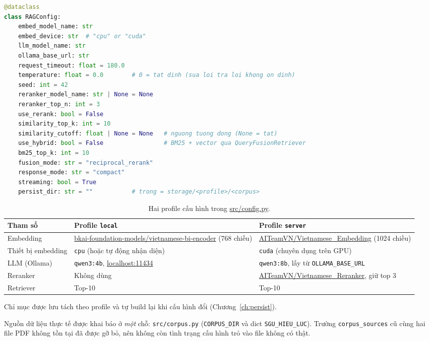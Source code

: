\begin{lstlisting}[language=Python, caption={Khai báo \texttt{dataclass RAGConfig} trong \texttt{src/config.py}.}, label={lst:ragconfig}]
@dataclass
class RAGConfig:
    embed_model_name: str
    embed_device: str  # "cpu" or "cuda"
    llm_model_name: str
    ollama_base_url: str
    request_timeout: float = 180.0
    temperature: float = 0.0        # 0 = tat dinh (sua loi tra loi khong on dinh)
    seed: int = 42
    reranker_model_name: str | None = None
    reranker_top_n: int = 3
    use_rerank: bool = False
    similarity_top_k: int = 10
    similarity_cutoff: float | None = None   # nguong tuong dong (None = tat)
    use_hybrid: bool = False                 # BM25 + vector qua QueryFusionRetriever
    bm25_top_k: int = 10
    fusion_mode: str = "reciprocal_rerank"
    response_mode: str = "compact"
    streaming: bool = True
    persist_dir: str = ""           # trong = storage/<profile>/<corpus>
\end{lstlisting}

\begin{table}[htbp]
  \centering
  \footnotesize
  \setlength{\tabcolsep}{4pt}
  \renewcommand{\arraystretch}{1.15}
  \begin{tabularx}{\textwidth}{l X X}
    \toprule
    \textbf{Tham số} & \textbf{Profile \texttt{local}} & \textbf{Profile \texttt{server}} \\
    \midrule
    Embedding & \url{bkai-foundation-models/vietnamese-bi-encoder} (768 chiều) & \url{AITeamVN/Vietnamese_Embedding} (1024 chiều) \\
    Thiết bị embedding & \texttt{cpu} (hoặc tự động nhận diện) & \texttt{cuda} (chuyên dụng trên GPU) \\
    LLM (Ollama) & \texttt{qwen3:4b}, \url{localhost:11434} & \texttt{qwen3:8b}, lấy từ \texttt{OLLAMA_BASE_URL} \\
    Reranker & Không dùng & \url{AITeamVN/Vietnamese_Reranker}, giữ top 3 \\
    Retriever & Top-10 & Top-10 \\
    \bottomrule
  \end{tabularx}
  \caption{Hai profile cấu hình trong \url{src/config.py}.}
  \label{tab:cau-hinh-profile}
\end{table}
Chỉ mục được lưu tách theo profile và tự build lại khi cấu hình đổi (Chương~\ref{ch:persist}).

Nguồn dữ liệu thực tế được khai báo ở \emph{một} chỗ: \texttt{src/corpus.py} (\texttt{CORPUS\_DIR} và dict \texttt{SGU\_HIEU\_LUC}). Trường \texttt{corpus\_sources} cũ cùng hai file PDF không tồn tại đã được gỡ bỏ, nên không còn tình trạng cấu hình trỏ vào file không có thật.

